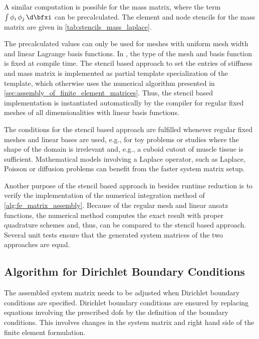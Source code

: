 A similar computation is possible for the mass matrix, where the term $\int \phi_i\,\phi_j \,\d\bfxi$ can be precalculated. The element and node stencils for the mass matrix are given in \cref{tab:stencils_mass_laplace}.

The precalculated values can only be used for meshes with uniform mesh width and linear Lagrange basis functions. In \opendihu{}, the type of the mesh and basis function is fixed at compile time. The stencil based approach to set the entries of stiffness and mass matrix is implemented as partial template specialization of the template, which otherwise uses the numerical algorithm presented in \cref{sec:assembly_of_finite_element_matrices}. Thus, the stencil based implementation is instantiated automatically by the compiler for regular fixed meshes of all dimensionalities with linear basis functions. 

The conditions for the stencil based approach are fulfilled whenever regular fixed meshes and linear bases are used, e.g., for toy problems or studies where the shape of the domain is irrelevant and, e.g., a cuboid cutout of muscle tissue is sufficient. Mathematical models involving a Laplace operator, such as Laplace, Poisson or diffusion problems can benefit from the faster system matrix setup.

Another purpose of the stencil based approach in \opendihu{} besides runtime reduction is to verify the implementation of the numerical integration method of \cref{alg:fe_matrix_assembly}. Because of the regular mesh and linear ansatz functions, the numerical method computes the exact result with proper quadrature schemes and, thus, can be compared to the stencil based approach. Several unit tests ensure that the generated system matrices of the two approaches are equal.


\subsection{Algorithm for Dirichlet Boundary Conditions}

The assembled system matrix needs to be adjusted when Dirichlet boundary conditions are specified.
Dirichlet boundary conditions are ensured by replacing equations involving the prescribed dofs by the definition of the boundary conditions. This involves changes in the system matrix and right hand side of the finite element formulation.

